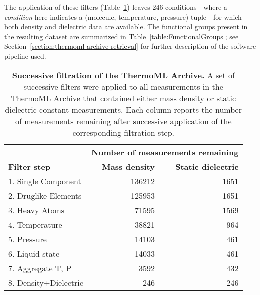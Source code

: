 \documentclass[aps,pre,twocolumn,nofootinbib,superscriptaddress,linenumbers]{revtex4-1}
\begin{document}
The application of these filters (Table~\ref{table:ThermoMLSummary}) leaves 246 conditions---where a \emph{condition} here indicates a (molecule, temperature, pressure) tuple---for which both density and dielectric data are available.  
The functional groups present in the resulting dataset are summarized in Table~\ref{table:FunctionalGroups}; see Section~\ref{section:thermoml-archive-retrieval} for further description of the software pipeline used.  


\begin{table}
\begin{tabular}{lrr}
\hline
 &  \multicolumn{2}{c}{\bf Number of measurements remaining} \\ \cline{2-3}
{\bf Filter step} &  {\bf Mass density} &  {\bf Static dielectric} \\ 
\hline
1.  Single Component   &               136212 &                                     1651 \\
2.  Druglike Elements  &               125953 &                                     1651 \\
3.  Heavy Atoms        &                71595 &                                     1569 \\
4.  Temperature        &                38821 &                                      964 \\
5.  Pressure           &                14103 &                                      461 \\
6.  Liquid state       &                14033 &                                      461 \\
7.  Aggregate T, P     &                 3592 &                                      432 \\
8.  Density+Dielectric &                  246 &                                      246 \\

\hline
\end{tabular}
\caption{{\bf Successive filtration of the ThermoML Archive.}
A set of successive filters were applied to all measurements in the ThermoML Archive that contained either mass density or static dielectric constant measurements.
Each column reports the number of measurements remaining after successive application of the corresponding filtration step.
% 
}
\label{table:ThermoMLSummary}
\end{table}
\end{document}
